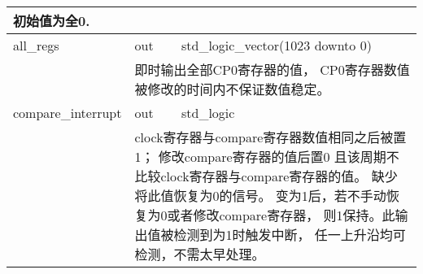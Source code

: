 \begin{tabularx}{\textwidth}{lll}
{	            初始值为全0.
            } \\
            \midrule
	        all\_regs       & out       & std\_logic\_vector(1023 downto 0) \\
            \cmidrule(l){2-3}
            &
            \multicolumn{2}{X}{
	            即时输出全部CP0寄存器的值，%
                CP0寄存器数值被修改的时间内不保证数值稳定。
            } \\
            \midrule
	        compare\_interrupt & out    & std\_logic \\
            \cmidrule(l){2-3}
            &
            \multicolumn{2}{X}{
	            clock寄存器与compare寄存器数值相同之后被置1；%
                修改compare寄存器的值后置0%
                且该周期不比较clock寄存器与compare寄存器的值。%
	            缺少将此值恢复为0的信号。%
	            变为1后，若不手动恢复为0或者修改compare寄存器，%
                则1保持。此输出值被检测到为1时触发中断，%
                任一上升沿均可检测，不需太早处理。
            } \\

            \bottomrule
        \end{tabularx}
